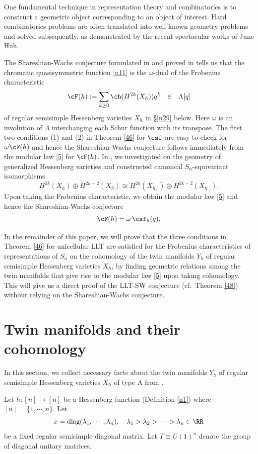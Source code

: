 \begin{remark}
One fundamental technique in representation theory and combinatorics is to 
construct a geometric object corresponding to an object of interest. 
Hard combinatorics problems are often translated into well known geometry problems and solved subsequently, as demonstrated by the recent spectacular works of June Huh.   


The Shareshian-Wachs conjecture  formulated in \cite{SW} and proved in \cite{BC, GP2}  tells us 
that the chromatic quasisymmetric function \eqref{n11} is the $\omega$-dual of the Frobenius characteristic 
$$\cF(h):=\sum_{k\ge 0} \ch (H^{2k}(X_h)) q^k \ \ \in \ \  \Lambda[q]$$ 
of regular semisimple Hessenberg varieties $X_h$ in \S\ref{n29} below. Here $\omega$ is an involution of $\Lambda$ interchanging each Schur function with its transpose.  
The first two conditions (1) and (2) in Theorem \ref{46} for $\csf$ are easy to check for $\omega \cF(h)$ and hence the Shareshian-Wachs conjecture follows immediately from the modular law \eqref{5} for $\cF(h)$. 
In \cite{KL}, we investigated on the geometry of generalized Hessenberg varieties and constructed canonical $S_n$-equivariant isomorphisms
$$H^{2k}(X_h)\oplus H^{2k-2}(X_h)\cong H^{2k}(X_{h_+})\oplus H^{2k-2}(X_{h_-}).$$
Upon taking the Frobenius characteristic, we obtain the modular law \eqref{5} and hence the Shareshian-Wachs conjecture $$\cF(h)=\omega\, \csf_h(q).$$ 

In the remainder of this paper, we will prove that the three conditions in Theorem \ref{46} for unicellular LLT are satisfied for the Frobenius characteristics of representations of $S_n$ on the cohomology of the twin manifolds $Y_h$ of regular semisimple Hessenberg varieties $X_h$, by finding geometric relations among the twin manifolds that give rise to the modular law \eqref{5} upon taking cohomology. This will give us a direct proof of the LLT-SW conjecture (cf.~Theorem \ref{48}) without relying on the Shareshian-Wachs conjecture.
\end{remark}

\section{Twin manifolds and their cohomology}\label{14}
In this section, we collect necessary facts about the twin manifolds $Y_h$ of regular semisimple Hessenberg varieties $X_h$ of type A 
from \cite{AB}.

Let $h:[n]\to [n]$ be a Hessenberg function (Definition \ref{n1}) where $[n]=\{1,\cdots, n\}$. 
Let $$x=\mathrm{diag}(\lambda_1,\cdots,\lambda_n),\quad
\lambda_1 >\lambda_2 >\cdots > \lambda_n \in \RR$$
be a fixed regular semisimple diagonal matrix. 
Let $T\cong U(1)^n$ denote the group of diagonal unitary matrices.


